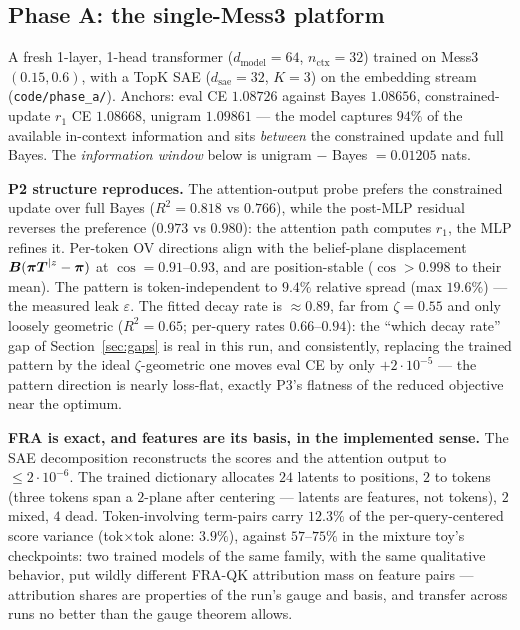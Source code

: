 \documentclass{article}
\begin{document}
\subsection{Phase A: the single-Mess3 platform}

A fresh 1-layer, 1-head transformer ($d_{\mathrm{model}} = 64$, $n_{\mathrm{ctx}} = 32$) trained on Mess3$(0.15, 0.6)$, with a TopK SAE ($d_{\mathrm{sae}} = 32$, $K = 3$) on the embedding stream (\texttt{code/phase\_a/}). Anchors: eval CE $1.08726$ against Bayes $1.08656$, constrained-update $r_1$ CE $1.08668$, unigram $1.09861$ --- the model captures $94\%$ of the available in-context information and sits \emph{between} the constrained update and full Bayes. The \emph{information window} below is unigram $-$ Bayes $= 0.01205$ nats.

\textbf{P2 structure reproduces.} The attention-output probe prefers the constrained update over full Bayes ($R^2 = 0.818$ vs $0.766$), while the post-MLP residual reverses the preference ($0.973$ vs $0.980$): the attention path computes $r_1$, the MLP refines it. Per-token OV directions align with the belief-plane displacement $\boldsymbol{B}(\boldsymbol{\pi}\boldsymbol{T}^{|z} - \boldsymbol{\pi})$ at $\cos = 0.91$--$0.93$, and are position-stable ($\cos > 0.998$ to their mean). The pattern is token-independent to $9.4\%$ relative spread (max $19.6\%$) --- the measured leak $\varepsilon$. The fitted decay rate is $\approx 0.89$, far from $\zeta = 0.55$ and only loosely geometric ($R^2 = 0.65$; per-query rates $0.66$--$0.94$): the ``which decay rate'' gap of Section~\ref{sec:gaps} is real in this run, and consistently, replacing the trained pattern by the ideal $\zeta$-geometric one moves eval CE by only $+2\cdot10^{-5}$ --- the pattern direction is nearly loss-flat, exactly P3's flatness of the reduced objective near the optimum.

\textbf{FRA is exact, and features are its basis, in the implemented sense.} The SAE decomposition reconstructs the scores and the attention output to $\le 2\cdot10^{-6}$. The trained dictionary allocates $24$ latents to positions, $2$ to tokens (three tokens span a $2$-plane after centering --- latents are features, not tokens), $2$ mixed, $4$ dead. Token-involving term-pairs carry $12.3\%$ of the per-query-centered score variance (tok$\times$tok alone: $3.9\%$), against $57$--$75\%$ in the mixture toy's checkpoints: two trained models of the same family, with the same qualitative behavior, put wildly different FRA-QK attribution mass on feature pairs --- attribution shares are properties of the run's gauge and basis, and transfer across runs no better than the gauge theorem allows.
\end{document}
